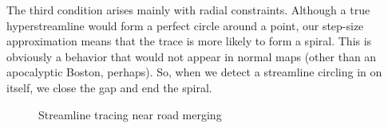 \documentclass[twocolumn]{article}
\begin{document}
The third condition arises mainly with radial constraints. Although a true
hyperstreamline would form a perfect circle around a point, our step-size
approximation means that the trace is more likely to form a spiral. This is
obviously a behavior that would not appear in normal maps (other than an
apocalyptic Boston, perhaps). So, when we detect a streamline circling in on
itself, we close the gap and end the spiral.

\begin{figure}[t!]
    \centering
    \caption{Streamline tracing near road merging}
\end{figure}
\end{document}
